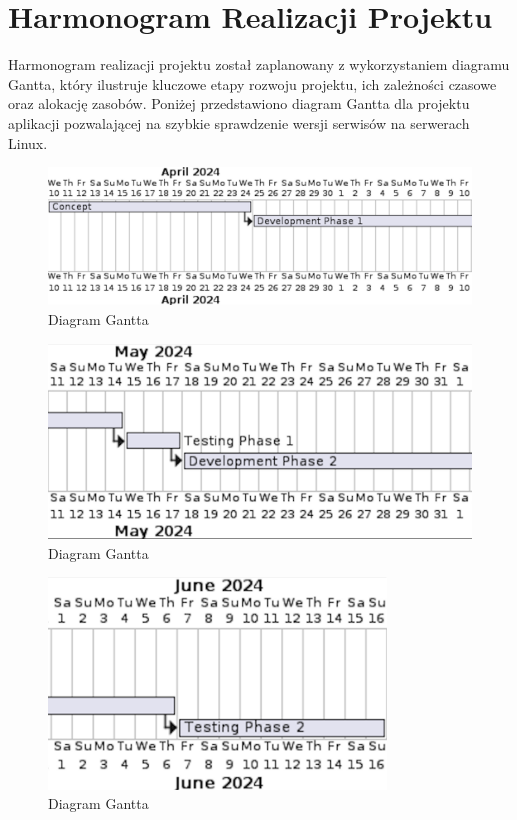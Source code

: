 \chapter{Harmonogram Realizacji Projektu}

Harmonogram realizacji projektu został zaplanowany z wykorzystaniem diagramu Gantta, który ilustruje kluczowe etapy rozwoju projektu, ich zależności czasowe oraz alokację zasobów. Poniżej przedstawiono diagram Gantta dla projektu aplikacji pozwalającej na szybkie sprawdzenie wersji serwisów na serwerach Linux.

\begin{figure}[H]
\centering
\includegraphics[width=\textwidth]{photos/Gant1.png}
\caption{Diagram Gantta}
\end{figure}
\begin{figure}[H]
\centering
\includegraphics[width=\textwidth]{photos/Gant2.png}
\caption{Diagram Gantta}
\end{figure}
\begin{figure}[H]
\centering
\includegraphics[width=0.80\textwidth]{photos/Gant3.png}
\caption{Diagram Gantta}
\end{figure}
